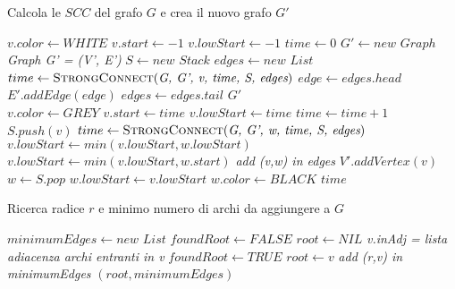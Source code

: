 \documentclass[10pt,a4paper,oneside,article,italian]{memoir}
\theoremstyle{definition}
\begin{document}
\begin{algorithm}
	\caption{Calcola le $SCC$ del grafo $G$ e crea il nuovo grafo $G'$}
	\begin{algorithmic}[1]
			\State $v.color \gets WHITE$
			\State $v.start \gets -1$
			\State $v.lowStart \gets -1$
		\EndFor
		\State $time \gets 0$
		\State $G' \gets new$ $Graph$ \Comment \textit{Graph G' = (V', E')}
		\State $S \gets new$ $Stack$
		\State $edges \gets new$ $List$
				\State $time \gets \textsc{StrongConnect}(\textit{G, G', v, time, S, edges})$
			\EndIf
		\EndFor
			\State $edge \gets edges.head$
			\State $E'.addEdge(edge)$
			\State $edges \gets edges.tail$
		\EndWhile
		\State\Return $G'$
	\EndProcedure
	\\
		\State $v.color \gets GREY$
		\State $v.start \gets time$
		\State $v.lowStart \gets time$
		\State $time \gets time+1$
		\State $S.push(v)$
				\State $time \gets \textsc{StrongConnect}(\textit{G, G', w, time, S, edges})$
				\State $v.lowStart \gets min(v.lowStart, w.lowStart)$
				\State $v.lowStart \gets min(v.lowStart, w.start)$
			\EndIf
				\State \textit{add (v,w) in edges}
			\EndIf
		\EndFor
			\State $V'.addVertex(v)$
			\Do
				\State $w \gets S.pop$
				\State $w.lowStart \gets v.lowStart$
				\State $w.color \gets BLACK$
		\EndIf
		\State\Return $time$
	\EndProcedure
	\end{algorithmic}
\end{algorithm}

\begin{algorithm}
	\caption{Ricerca radice $r$ e minimo numero di archi da aggiungere a $G$}
	\begin{algorithmic}[1]
		\State $minimumEdges \gets new$ $List$
		\State $foundRoot \gets FALSE$
		\State $root \gets NIL$
		 \Comment \textit{v.inAdj = lista adiacenza archi entranti in v}
				\State $foundRoot \gets TRUE$
				\State $root \gets v$
				\State \textit{add (r,v) in minimumEdges}
			\EndIf
		\EndFor
		\State\Return $(root, minimumEdges)$
	\EndProcedure
	\end{algorithmic}
\end{algorithm}
\end{document}
